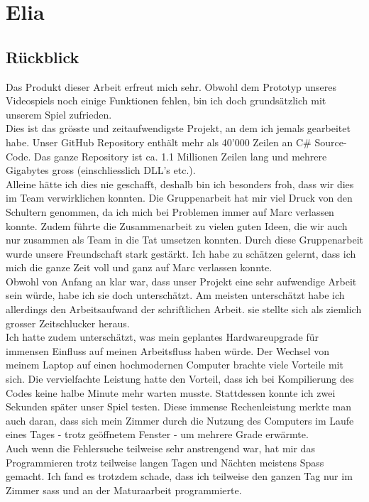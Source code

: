 \chapter{Elia}

\section{Rückblick}
Das Produkt dieser Arbeit erfreut mich sehr. Obwohl dem Prototyp unseres Videospiels noch einige Funktionen fehlen, bin ich doch grundsätzlich mit unserem Spiel zufrieden. \\
Dies ist das grösste und zeitaufwendigste Projekt, an dem ich jemals gearbeitet habe. Unser GitHub Repository enthält mehr als 40'000 Zeilen an C\# Source-Code.
Das ganze Repository ist ca. 1.1 Millionen Zeilen lang und mehrere Gigabytes gross (einschliesslich DLL's etc.). \\
Alleine hätte ich dies nie geschafft, deshalb bin ich besonders froh, dass wir dies im Team verwirklichen konnten. Die Gruppenarbeit hat mir viel Druck von den Schultern genommen, da ich mich bei Problemen immer auf Marc
verlassen konnte. Zudem führte die Zusammenarbeit zu vielen guten Ideen, die wir auch nur zusammen als Team in die Tat umsetzen konnten. Durch diese Gruppenarbeit wurde unsere Freundschaft stark gestärkt.
Ich habe zu schätzen gelernt, dass ich mich die ganze Zeit voll und ganz auf Marc verlassen konnte.\\
Obwohl von Anfang an klar war, dass unser Projekt eine sehr aufwendige Arbeit sein würde, habe ich sie doch unterschätzt. Am meisten unterschätzt habe ich allerdings den Arbeitsaufwand der schriftlichen Arbeit. sie stellte sich als ziemlich grosser Zeitschlucker heraus. \\
Ich hatte zudem unterschätzt, was mein geplantes Hardwareupgrade für immensen Einfluss auf meinen Arbeitsfluss haben würde. Der Wechsel von meinem Laptop auf einen hochmodernen Computer brachte viele Vorteile mit sich.
Die vervielfachte Leistung hatte den Vorteil, dass ich bei Kompilierung des Codes keine halbe Minute mehr warten musste. Stattdessen konnte ich zwei Sekunden später unser Spiel testen.
Diese immense Rechenleistung merkte man auch daran, dass sich mein Zimmer durch die Nutzung des Computers im Laufe eines Tages - trotz geöffnetem Fenster - um mehrere Grade erwärmte.\\
Auch wenn die Fehlersuche teilweise sehr anstrengend war, hat mir das Programmieren trotz teilweise langen Tagen und Nächten meistens Spass gemacht. Ich fand es trotzdem schade,
dass ich teilweise den ganzen Tag nur im Zimmer sass und an der Maturaarbeit programmierte. 

